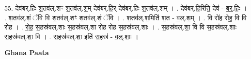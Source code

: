 \documentclass[17pt]{extarticle}
\begin{document}
55. देव॑बर्.हिः श॒तव॑ल्.शꣳ श॒तव॑ल्.श॒म् देव॑बर्.हि॒र् देव॑बर्.हिः श॒तव॑ल्.शम् । . देव॑बर्.हि॒रिति॒ देव॑ - ब॒र्॒.हिः॒ । . श॒तव॑ल्.शं॒ ॅवि वि श॒तव॑ल्.शꣳ श॒तव॑ल्.शं॒ ॅवि । . श॒तव॑ल्.श॒मिति॑ श॒त - व॒ल्.श॒म् । . वि रो॑ह रोह॒ वि वि रो॑ह । . रो॒ह॒ स॒हस्र॑वल्.शाः स॒हस्र॑वल्.शा रोह रोह स॒हस्र॑वल्.शाः । . स॒हस्र॑वल्.शा॒ वि वि स॒हस्र॑वल्.शाः स॒हस्र॑वल्.शा॒ वि । . स॒हस्र॑वल्.शा॒ इति॑ स॒हस्र॑ - व॒ल्॒.शाः॒ । \newline

\textbf{Ghana Paata } \newline
\end{document}
